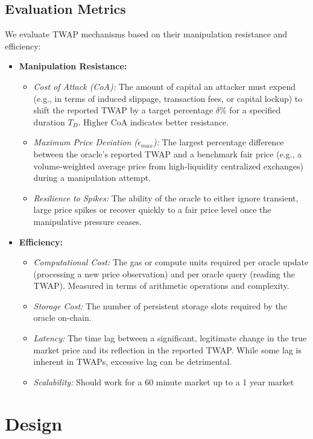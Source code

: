 \documentclass{article}
\begin{document}
\subsection{Evaluation Metrics}
We evaluate TWAP mechanisms based on their manipulation resistance and efficiency:
\begin{itemize}
    \item \textbf{Manipulation Resistance:}
        \begin{itemize}
            \item \textit{Cost of Attack (CoA):} The amount of capital an attacker must expend (e.g., in terms of induced slippage, transaction fees, or capital lockup) to shift the reported TWAP by a target percentage $\delta\%$ for a specified duration $T_D$. Higher CoA indicates better resistance.
            \item \textit{Maximum Price Deviation ($\epsilon_{max}$):} The largest percentage difference between the oracle's reported TWAP and a benchmark fair price (e.g., a volume-weighted average price from high-liquidity centralized exchanges) during a manipulation attempt.
            \item \textit{Resilience to Spikes:} The ability of the oracle to either ignore transient, large price spikes or recover quickly to a fair price level once the manipulative pressure ceases.
        \end{itemize}
    \item \textbf{Efficiency:}
        \begin{itemize}
            \item \textit{Computational Cost:} The gas or compute units required per oracle update (processing a new price observation) and per oracle query (reading the TWAP). Measured in terms of arithmetic operations and complexity.
            \item \textit{Storage Cost:} The number of persistent storage slots required by the oracle on-chain.
            \item \textit{Latency:} The time lag between a significant, legitimate change in the true market price and its reflection in the reported TWAP. While some lag is inherent in TWAPs, excessive lag can be detrimental.
            \item \textit{Scalability:} Should work for a 60 minute market up to a 1 year market 
        \end{itemize}
\end{itemize}

\section{Design}
\end{document}

